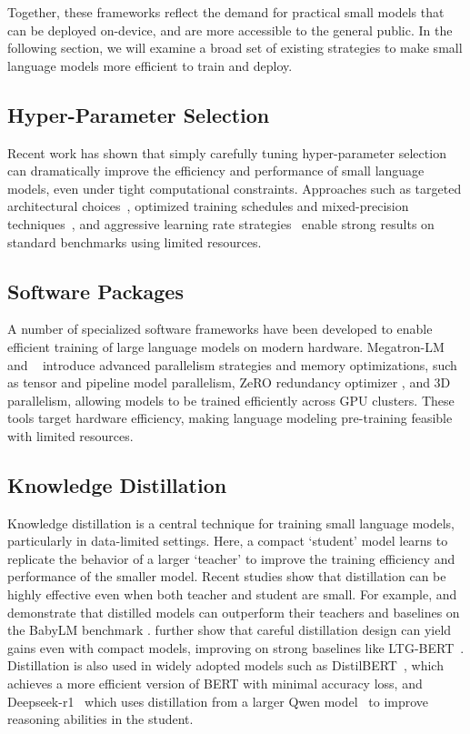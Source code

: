 Together, these frameworks reflect the demand for practical small models that can be deployed on-device, and are more accessible to the general public. In the following section, we will examine a broad set of existing strategies to make small language models more efficient to train and deploy.

\subsection{Hyper-Parameter Selection}

Recent work has shown that simply carefully tuning hyper-parameter selection can dramatically improve the efficiency and performance of small language models, even under tight computational constraints. Approaches such as targeted architectural choices~\citep{hillier2024super}, optimized training schedules and mixed-precision techniques~\citep{izsak2021train}, and aggressive learning rate strategies~\citep{geiping2023cramming} enable strong results on standard benchmarks using limited resources.

\subsection{Software Packages}

A number of specialized software frameworks have been developed to enable efficient training of large language models on modern hardware. Megatron-LM~\citep{narayanan2021megatron} and ~\citep{rasley2020deepspeed} introduce advanced parallelism strategies and memory optimizations, such as tensor and pipeline model parallelism, ZeRO redundancy optimizer \citep{rajbhandari2020zero}, and 3D parallelism, allowing models to be trained efficiently across GPU clusters. These tools target hardware efficiency, making language modeling pre-training feasible with limited resources.

\subsection{Knowledge Distillation}

Knowledge distillation is a central technique for training small language models, particularly in data-limited settings. Here, a compact `student' model learns to replicate the behavior of a larger `teacher' to improve the training efficiency and performance of the smaller model.
Recent studies show that distillation can be highly effective even when both teacher and student are small. For example, \citet{timiryasov2023baby} and \citet{tastet2024babyllama2} demonstrate that distilled models can outperform their teachers and baselines on the BabyLM benchmark \citep{warstadt2023babylm1, conll2024babylm2}. \citet{yam2024tinyminds} further show that careful distillation design can yield gains even with compact models, improving on strong baselines like LTG-BERT~\citep{samuel2023ltgbert}.
Distillation is also used in widely adopted models such as DistilBERT~\citep{sanh2019distilbert}, which achieves a more efficient version of BERT with minimal accuracy loss, and Deepseek-r1~\citep{guo2025deepseekr1} which uses distillation from a larger Qwen model~\citep{alibaba2023qwen} to improve reasoning abilities in the student.

